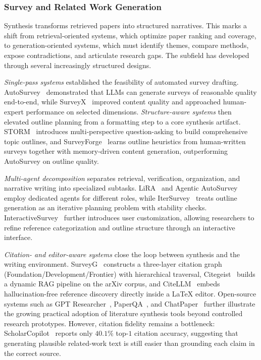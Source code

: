 \subsubsection{Survey and Related Work Generation}
\label{sec:related_work}

Synthesis transforms retrieved papers into structured narratives. This marks a shift from retrieval-oriented systems, which optimize paper ranking and coverage, to generation-oriented systems, which must identify themes, compare methods, expose contradictions, and articulate research gaps. The subfield has developed through several increasingly structured designs.

\emph{Single-pass systems} established the feasibility of automated survey drafting. AutoSurvey~\cite{wang2024autosurvey} demonstrated that LLMs can generate surveys of reasonable quality end-to-end, while SurveyX~\cite{liang2025surveyx} improved content quality and approached human-expert performance on selected dimensions. \emph{Structure-aware systems} then elevated outline planning from a formatting step to a core synthesis artifact. STORM~\cite{shao2024storm} introduces multi-perspective question-asking to build comprehensive topic outlines, and SurveyForge~\cite{gao2025surveyforge} learns outline heuristics from human-written surveys together with memory-driven content generation, outperforming AutoSurvey on outline quality.

\emph{Multi-agent decomposition} separates retrieval, verification, organization, and narrative writing into specialized subtasks. LiRA~\cite{lira2025} and Agentic AutoSurvey~\cite{agenticautosurvey2025} employ dedicated agents for different roles, while IterSurvey~\cite{itersurvey2025} treats outline generation as an iterative planning problem with stability checks. InteractiveSurvey~\cite{interactivesurvey2025} further introduces user customization, allowing researchers to refine reference categorization and outline structure through an interactive interface.

\emph{Citation- and editor-aware systems} close the loop between synthesis and the writing environment. SurveyG~\cite{surveyg2025} constructs a three-layer citation graph (Foundation/Development/Frontier) with hierarchical traversal, Citegeist~\cite{beger2025citegeist} builds a dynamic RAG pipeline on the arXiv corpus, and CiteLLM~\cite{citellm2026} embeds hallucination-free reference discovery directly inside a LaTeX editor. Open-source systems such as GPT Researcher~\cite{gptresearcher2024}, PaperQA~\cite{paperqa2024github}, and ChatPaper~\cite{chatpaper2023} further illustrate the growing practical adoption of literature synthesis tools beyond controlled research prototypes. However, citation fidelity remains a bottleneck: ScholarCopilot~\cite{scholarcop2025} reports only $40.1\%$ top-$1$ citation accuracy, suggesting that generating plausible related-work text is still easier than grounding each claim in the correct source.




